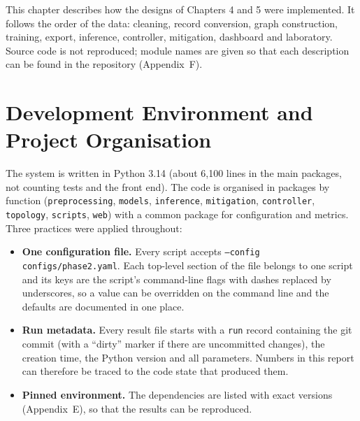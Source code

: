 This chapter describes how the designs of Chapters 4 and 5 were implemented. It follows the order of the data: cleaning, record conversion, graph construction, training, export, inference, controller, mitigation, dashboard and laboratory. Source code is not reproduced; module names are given so that each description can be found in the repository (Appendix~F).\\

\section{Development Environment and Project Organisation}
The system is written in Python 3.14 (about 6,100 lines in the main packages, not counting tests and the front end). The code is organised in packages by function (\texttt{preprocessing}, \texttt{models}, \texttt{inference}, \texttt{mitigation}, \texttt{controller}, \texttt{topology}, \texttt{scripts}, \texttt{web}) with a common package for configuration and metrics. Three practices were applied throughout:
\begin{itemize}
	\item \textbf{One configuration file.} Every script accepts \texttt{--config configs/phase2.yaml}. Each top-level section of the file belongs to one script and its keys are the script's command-line flags with dashes replaced by underscores, so a value can be overridden on the command line and the defaults are documented in one place.
	\item \textbf{Run metadata.} Every result file starts with a \texttt{run} record containing the git commit (with a ``dirty'' marker if there are uncommitted changes), the creation time, the Python version and all parameters. Numbers in this report can therefore be traced to the code state that produced them.
	\item \textbf{Pinned environment.} The dependencies are listed with exact versions (Appendix~E), so that the results can be reproduced.
\end{itemize}

